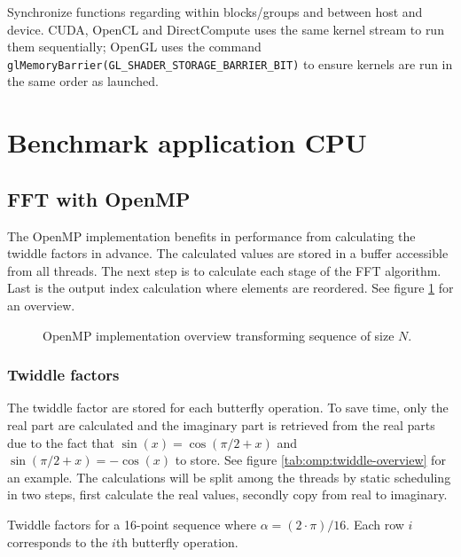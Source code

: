 \begin{table}[h!]
	\centering
	
	\caption{Synchronize functions regarding within blocks/groups and between host and device. CUDA, OpenCL and DirectCompute uses the same kernel stream to run them sequentially; OpenGL uses the command \texttt{glMemoryBarrier(GL\_SHADER\_STORAGE\_BARRIER\_BIT)} to ensure kernels are run in the same order as launched.}
	\label{tab:kernel-synchronization}
\end{table}

\section{Benchmark application CPU}

\subsection{FFT with OpenMP}

The OpenMP implementation benefits in performance from calculating the twiddle factors in advance. The calculated values are stored in a buffer accessible from all threads. The next step is to calculate each stage of the FFT algorithm. Last is the output index calculation where elements are reordered. See figure \ref{fig:omp:overview} for an overview.

\begin{figure}
	\centering
	
	\caption{OpenMP implementation overview transforming sequence of size $N$.}
	\label{fig:omp:overview}
\end{figure}

\subsubsection{Twiddle factors}

The twiddle factor are stored for each butterfly operation. To save time, only the real part are calculated and the imaginary part is retrieved from the real parts due to the fact that $\sin(x) = \cos(\pi/2 + x)$ and $\sin(\pi/2 + x) = -\cos(x)$ to store. See figure \ref{tab:omp:twiddle-overview} for an example. The calculations will be split among the threads by static scheduling in two steps, first calculate the real values, secondly copy from real to imaginary.

\begin{table}[h!]
	\centering
	
	\caption{Twiddle factors for a 16-point sequence where $\alpha = (2 \cdot \pi) / 16$. Each row $i$ corresponds to the $i$th butterfly operation.}
	\label{tab:omp:twiddle-overview}
\end{table}

